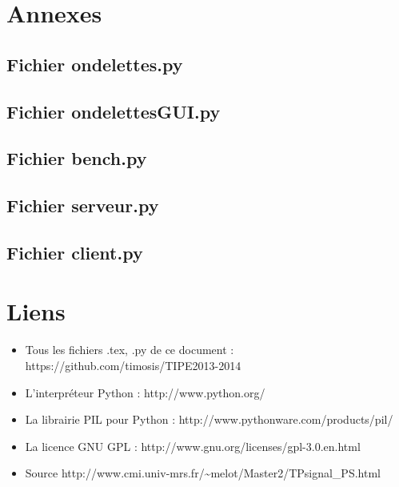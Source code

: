 \documentclass{article}
\begin{document}
\clearpage
\lstset{language=Python,frame=single,breaklines=true,extendedchars=true, numbers=left,basicstyle=\footnotesize}
\section{Annexes}

\subsection{Fichier ondelettes.py}


\subsection{Fichier ondelettesGUI.py}


\subsection{Fichier bench.py}


\subsection{Fichier serveur.py}


\subsection{Fichier client.py}



\section{Liens}

\begin{itemize}
\item Tous les fichiers .tex, .py de ce document : https://github.com/timosis/TIPE2013-2014

\item L'interpréteur Python : http://www.python.org/

\item La librairie PIL pour Python : http://www.pythonware.com/products/pil/

\item La licence GNU GPL : http://www.gnu.org/licenses/gpl-3.0.en.html


\item Source http://www.cmi.univ-mrs.fr/\textasciitilde{}melot/Master2/TPsignal\_PS.html
\end{itemize}
\end{document}

